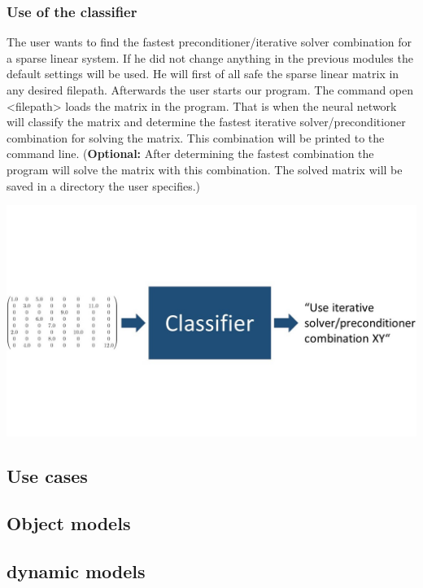 \documentclass[parskip=full]{scrartcl}
\begin{document}
\subsubsection{Use of the classifier}

The user wants to find the fastest preconditioner/iterative solver combination for a sparse linear system. If he did not change anything in the previous modules the default settings will be used. He will first of all safe the sparse linear matrix in any desired filepath. Afterwards the user starts our program. The command open <filepath> loads the matrix in the program. That is when the neural network will classify the matrix and determine the fastest iterative solver/preconditioner combination for solving the matrix. This combination will be printed to the command line. (\textbf{Optional:} After determining the fastest combination the program will solve the matrix with this combination. The solved matrix will be saved in a directory the user specifies.)
\begin{center}
\includegraphics[width=\textwidth]{classifier}
\end{center}


\subsection{Use cases}
\subsection{Object models}
\subsection{dynamic models}
\end{document}

